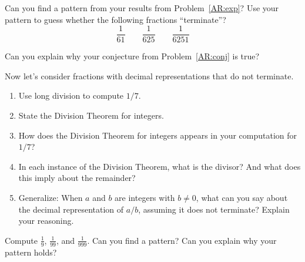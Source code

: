 \documentclass[nooutcomes]{ximera}
\begin{document}

\begin{problem}\label{AR:conj}
Can you find a pattern from your results from Problem~\ref{AR:exp}?
Use your pattern to guess whether the following fractions
``terminate''?  
\[
\dfrac{1}{61}\qquad \dfrac{1}{625} \qquad \dfrac{1}{6251}
\]
\end{problem}


\begin{problem}
Can you explain why your conjecture from Problem~\ref{AR:conj} is true?
\end{problem}

\begin{problem} Now let's consider fractions with decimal representations that do not terminate.  
\begin{enumerate}
\item Use long division to compute $1/7$.
\item {}
State the Division Theorem for integers.
\item How does the Division Theorem for integers appears in your computation for $1/7$?
\item In each instance of the Division Theorem, what 
is the divisor? And what does this imply about the remainder?
\item Generalize:  When $a$ and $b$ are integers with $b\ne 0$, 
what can you say about the decimal representation of $a/b$, assuming
it does not terminate?  Explain your reasoning.  
\end{enumerate}
\end{problem}

\begin{problem}\label{AR:nines} 
Compute $\frac{1}{9}$, $\frac{1}{99}$, and $\frac{1}{999}$. Can you
find a pattern? Can you explain why your pattern holds?
\end{problem}
\end{document}
